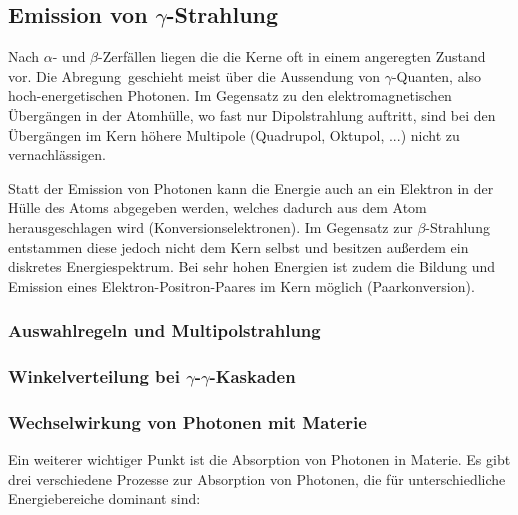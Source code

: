 \subsection{Emission von $\gamma$-Strahlung}

Nach $\alpha$- und $\beta$-Zerfällen liegen die die Kerne oft in einem angeregten Zustand vor. Die \glqq Abregung\grqq\ geschieht meist über die Aussendung von $\gamma$-Quanten, also hoch-energetischen Photonen. Im Gegensatz zu den elektromagnetischen Übergängen in der Atomhülle, wo fast nur Dipolstrahlung auftritt, sind bei den Übergängen im Kern höhere Multipole (Quadrupol, Oktupol, ...) nicht zu vernachlässigen. 

Statt der Emission von Photonen kann die Energie auch an ein Elektron in der Hülle des Atoms abgegeben werden, welches dadurch aus dem Atom herausgeschlagen wird (Konversionselektronen). Im Gegensatz zur $\beta$-Strahlung entstammen diese jedoch nicht dem Kern selbst und besitzen außerdem ein diskretes Energiespektrum. Bei sehr hohen Energien ist zudem die Bildung und Emission eines Elektron-Positron-Paares im Kern möglich (Paarkonversion).

\subsubsection{Auswahlregeln und Multipolstrahlung}

\subsubsection{Winkelverteilung bei $\gamma$-$\gamma$-Kaskaden}

\subsubsection{Wechselwirkung von Photonen mit Materie}

Ein weiterer wichtiger Punkt ist die Absorption von Photonen in Materie. Es gibt drei verschiedene Prozesse zur Absorption von Photonen, die für unterschiedliche Energiebereiche dominant sind:

